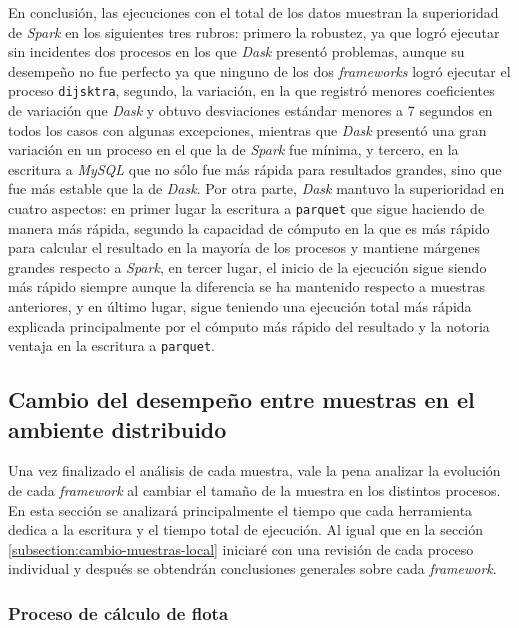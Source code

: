 En conclusión, las ejecuciones con el total de los datos muestran la superioridad de \textit{Spark} en los siguientes tres rubros: primero la robustez, ya que logró ejecutar sin incidentes dos procesos en los que \textit{Dask} presentó problemas, aunque su desempeño no fue perfecto ya que ninguno de los dos \textit{frameworks} logró ejecutar el proceso \texttt{dijsktra}, segundo, la variación, en la que registró menores coeficientes de variación que \textit{Dask} y obtuvo desviaciones estándar menores a 7 segundos en todos los casos con algunas excepciones, mientras que \textit{Dask} presentó una gran variación en un proceso en el que la de \textit{Spark} fue mínima, y tercero, en la escritura a \textit{MySQL} que no sólo fue más rápida para resultados grandes, sino que fue más estable que la de \textit{Dask}. Por otra parte, \textit{Dask} mantuvo la superioridad en cuatro aspectos: en primer lugar la escritura a \texttt{parquet} que sigue haciendo de manera más rápida, segundo la capacidad de cómputo en la que es más rápido para calcular el resultado en la mayoría de los procesos y mantiene márgenes grandes respecto a \textit{Spark}, en tercer lugar, el inicio de la ejecución sigue siendo más rápido siempre aunque la diferencia se ha mantenido respecto a muestras anteriores, y en último lugar, sigue teniendo una ejecución total más rápida explicada principalmente por el cómputo más rápido del resultado y la notoria ventaja en la escritura a \texttt{parquet}.



\subsection{Cambio del desempeño entre muestras en el ambiente distribuido}

Una vez finalizado el análisis de cada muestra, vale la pena analizar la evolución de cada \textit{framework} al cambiar el tamaño de la muestra en los distintos procesos. En esta sección se analizará principalmente el tiempo que cada herramienta dedica a la escritura y el tiempo total de ejecución. Al igual que en la sección \ref{subsection:cambio-muestras-local} iniciaré con una revisión de cada proceso individual y después se obtendrán conclusiones generales sobre cada \textit{framework}.

\subsubsection{Proceso de cálculo de flota}

